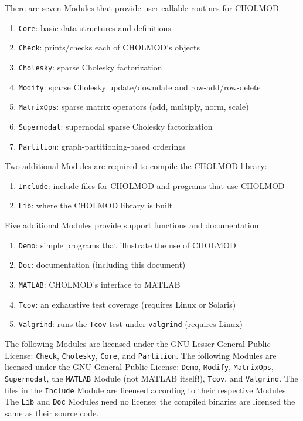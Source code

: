 \documentclass[11pt]{article}
\begin{document}
\vspace{0.1in}
\noindent There are seven Modules that provide user-callable routines for CHOLMOD.
    \begin{enumerate}
    \item {\tt Core}: basic data structures and definitions
    \item {\tt Check}: prints/checks each of CHOLMOD's objects
    \item {\tt Cholesky}: sparse Cholesky factorization
    \item {\tt Modify}: sparse Cholesky update/downdate and row-add/row-delete
    \item {\tt MatrixOps}: sparse matrix operators (add, multiply, norm, scale)
    \item {\tt Supernodal}: supernodal sparse Cholesky factorization
    \item {\tt Partition}: graph-partitioning-based orderings
    \end{enumerate}

\noindent Two additional Modules are required to compile the CHOLMOD library:
    \begin{enumerate}
    \item {\tt Include}: include files for CHOLMOD and programs that use CHOLMOD
    \item {\tt Lib}: where the CHOLMOD library is built
    \end{enumerate}

\noindent Five additional Modules provide support functions and documentation:
    \begin{enumerate}
    \item {\tt Demo}: simple programs that illustrate the use of CHOLMOD
    \item {\tt Doc}: documentation (including this document)
    \item {\tt MATLAB}: CHOLMOD's interface to MATLAB
    \item {\tt Tcov}: an exhaustive test coverage (requires Linux or Solaris)
    \item {\tt Valgrind}: runs the {\tt Tcov} test under {\tt valgrind} (requires Linux)
    \end{enumerate}

The following Modules are licensed under the GNU Lesser General Public
License: {\tt Check}, {\tt Cholesky}, {\tt Core}, and {\tt Partition}.
The following Modules are licensed under the GNU General Public
License: {\tt Demo}, {\tt Modify}, {\tt MatrixOps}, {\tt Supernodal},
the {\tt MATLAB} Module (not MATLAB itself!), {\tt Tcov}, and {\tt Valgrind}.
The files in the {\tt Include} Module are licensed according to
their respective Modules.  The {\tt Lib} and {\tt Doc} Modules need
no license; the compiled binaries are licensed the same as their source code.
\end{document}
